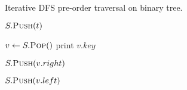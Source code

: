 
\begin{algorithm}[H]
  \caption{Iterative DFS pre-order traversal on binary tree.}
  \begin{algorithmic}[]
      \State $S.\Call{Push}{t}$ 

      \Statex
	\State $v \gets S.\Call{Pop}{\null}$
	\State print $v.key$

	\Statex
	  \State $S.\Call{Push}{v.right}$
	\EndIf

	  \State $S.\Call{Push}{v.left}$
	\EndIf
      \EndWhile
    \EndProcedure

    \Statex
    \State {}
  \end{algorithmic}
\end{algorithm}
